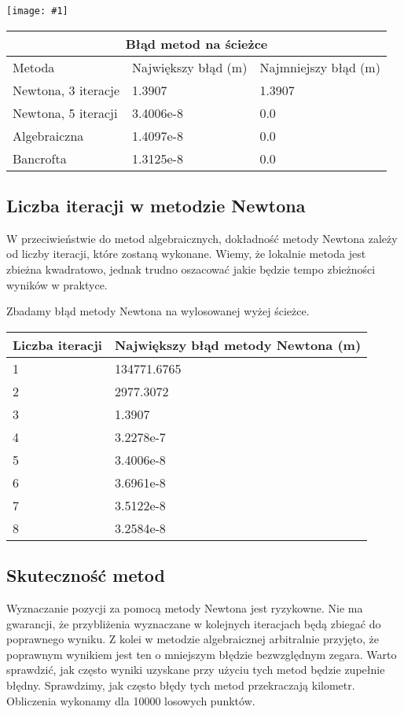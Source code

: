 \documentclass{article}
\newcommand{\plot}[1] {
	\texttt{[image: \#1]}
}
\begin{document}
\plot{sciezkiteoretyczne.png}
	
\begin{tabular}{ |p{3.5cm}|p{3.5cm}|p{3.5cm}|  }
 \hline
 \multicolumn{3}{|c|}{Błąd metod na ścieżce} \\
 \hline
 	Metoda    & Największy błąd (m) & Najmniejszy błąd (m)\\
 \hline
 	Newtona, 3 iteracje   & 1.3907    & 1.3907\\
 \hline
 	Newtona, 5 iteracji &   3.4006e-8 & 0.0 \\
 \hline
 	Algebraiczna & 1.4097e-8 & 0.0\\
 \hline
 	Bancrofta & 1.3125e-8 & 0.0\\
 \hline
\end{tabular}


\subsection{Liczba iteracji w metodzie Newtona}
\par W przeciwieństwie do metod algebraicznych, dokładność metody Newtona zależy od liczby iteracji, które zostaną wykonane. Wiemy, że lokalnie metoda jest zbieżna kwadratowo, jednak trudno oszacować jakie będzie tempo zbieżności wyników w praktyce. 

\par Zbadamy błąd metody Newtona na wylosowanej wyżej ścieżce.
	
\begin{tabular}{ |p{4cm}|p{6cm}|  }
 \hline
 	Liczba iteracji    & Największy błąd metody Newtona (m)\\
 \hline 
  	1 & 134771.6765 \\
 \hline 
 	2 & 2977.3072\\
 \hline 
 	3 & 1.3907\\
 \hline
 	4 & 3.2278e-7\\
 \hline 
 	5 & 3.4006e-8\\
 \hline 
 	6 & 3.6961e-8\\
 \hline 
 	7 & 3.5122e-8\\
 \hline
 	8 & 3.2584e-8\\
 \hline
\end{tabular}


\subsection{Skuteczność metod}
	Wyznaczanie pozycji za pomocą metody Newtona jest ryzykowne. Nie ma gwarancji, że przybliżenia wyznaczane w kolejnych iteracjach będą zbiegać do poprawnego wyniku. Z kolei w metodzie algebraicznej arbitralnie przyjęto, że poprawnym wynikiem jest ten o mniejszym błędzie bezwzględnym zegara. Warto sprawdzić, jak często wyniki uzyskane przy użyciu tych metod będzie zupełnie błędny. Sprawdzimy, jak często błędy tych metod przekraczają kilometr. Obliczenia wykonamy dla 10000 losowych punktów. \\
	
\end{document}
